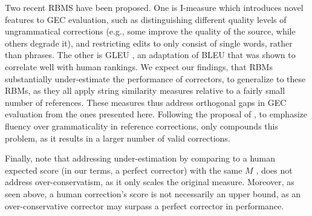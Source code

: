 \documentclass[letterpaper, 11pt]{article}
\begin{document}
Two recent RBMS have been proposed.
One is {\sc I-measure} \cite{felice2015towards}
which introduces novel features to GEC evaluation, such as distinguishing
different quality levels of ungrammatical corrections (e.g., some improve the quality of
the source, while others degrade it), and restricting edits to only consist of single words,
rather than phrases. The other is GLEU \cite{napoles2015ground}, an adaptation of BLEU that 
was shown to correlate well with human rankings. We expect our findings, that RBMs substantially under-estimate the
performance of correctors, to generalize to these RBMs, as they all
apply string similarity measures relative to a fairly small number of references.
These measures thus address orthogonal gaps in GEC evaluation from the ones presented here.
Following the proposal of , to emphasize fluency over grammaticality
in reference corrections, only compounds this problem, as it results in a larger number of valid corrections.


Finally, note that addressing under-estimation by comparing to
a human expected score (in our terms, a perfect corrector) with the same $M$ \cite{bryant2015far},
does not address over-conservatism, as it only
scales the original measure. Moreover, as seen above, a human correction's score
is not necessarily an upper bound, as an over-conservative corrector may surpass a perfect corrector in performance.
\end{document}
